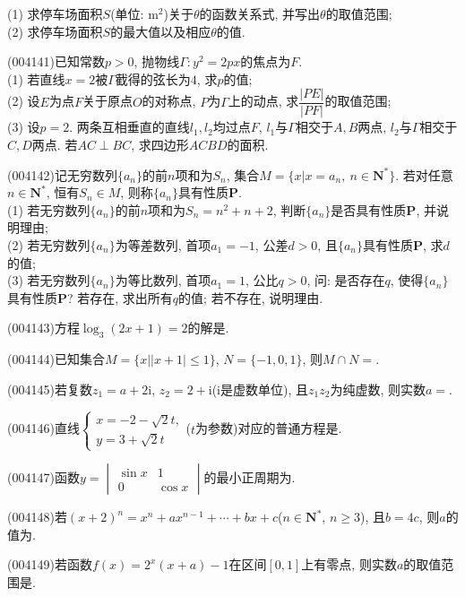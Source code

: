 (1) 求停车场面积$S$(单位: $\text{m}^2$)关于$\theta$的函数关系式, 并写出$\theta$的取值范围;\\
(2) 求停车场面积$S$的最大值以及相应$\theta$的值.
\item (004141)已知常数$p>0$, 抛物线$\Gamma:y^2=2px$的焦点为$F$.\\
(1) 若直线$x=2$被$\Gamma$截得的弦长为$4$, 求$p$的值;\\
(2) 设$E$为点$F$关于原点$O$的对称点, $P$为$\Gamma$上的动点, 求$\dfrac{|PE|}{|PF|}$的取值范围;\\
(3) 设$p=2$. 两条互相垂直的直线$l_1,l_2$均过点$F$, $l_1$与$\Gamma$相交于$A,B$两点, $l_2$与$\Gamma$相交于$C,D$两点. 若$AC\perp BC$, 求四边形$ACBD$的面积.
\item (004142)记无穷数列$\{a_n\}$的前$n$项和为$S_n$, 集合$M=\{x|x=a_n, \ n\in \mathbf{N}^*\}$. 若对任意$n\in \mathbf{N}^*$, 恒有$S_n\in M$, 则称$\{a_n\}$具有性质$\mathbf{P}$.\\
(1) 若无穷数列$\{a_n\}$的前$n$项和为$S_n=n^2+n+2$, 判断$\{a_n\}$是否具有性质$\mathbf{P}$, 并说明理由;\\
(2) 若无穷数列$\{a_n\}$为等差数列, 首项$a_1=-1$, 公差$d>0$, 且$\{a_n\}$具有性质$\mathbf{P}$, 求$d$的值;\\
(3) 若无穷数列$\{a_n\}$为等比数列, 首项$a_1=1$, 公比$q>0$, 问: 是否存在$q$, 使得$\{a_n\}$具有性质$\mathbf{P}$? 若存在, 求出所有$q$的值; 若不存在, 说明理由.
\item (004143)方程$\log_3(2x+1)=2$的解是.
\item (004144)已知集合$M=\{x||x+1|\le 1\}$, $N=\{-1,0,1\}$, 则$M\cap N=$.
\item (004145)若复数$z_1=a+2\mathrm{i}$, $z_2=2+\mathrm{i}$($\mathrm{i}$是虚数单位), 且$z_1z_2$为纯虚数, 则实数$a=$.
\item (004146)直线$\begin{cases} x=-2-\sqrt 2t, \\ y=3+\sqrt 2t \end{cases}$($t$为参数)对应的普通方程是.
\item (004147)函数$y=\begin{vmatrix}
   \sin x & 1  \\0 & \cos x  \end{vmatrix}$的最小正周期为.
\item (004148)若$(x+2)^n=x^n+ax^{n-1}+\cdots +bx+c$($n\in \mathbf{N}^*$, $ n\ge 3$), 且$b=4c$, 则$a$的值为.
\item (004149)若函数$f(x)=2^x(x+a)-1$在区间$[0,1]$上有零点, 则实数$a$的取值范围是.
